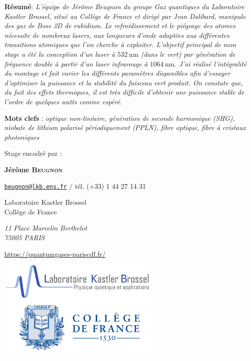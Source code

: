 \documentclass[11pt,a4paper]{article}
\newcommand{\lmbd}[1]{$\SI{#1}{\nano\metre}$}
\begin{document}
\begin{@empty}
\begin{center}
\parbox{15cm}{\small
	\textbf{R\'esum\'e}: \it L'équipe de Jérôme Beugnon du groupe Gaz quantiques du Laboratoire Kastler Brossel, situé au Collège de France et dirigé par Jean Dalibard, manipule des gaz de Bose 2D de rubidium. Le refroidissement et le piégeage des atomes nécessite de nombreux lasers, aux longueurs d'onde adaptées aux différentes transitions atomiques que l'on cherche à exploiter.
	L'objectif principal de mon stage a été la conception d'un laser à $\SI{532}{\nano\metre}$ (dans le vert) par génération de fréquence double à partir d'un laser infrarouge à \lmbd{1064}. J'ai réalisé l'intégralité du montage et fait varier les différents paramètres disponibles afin d'essayer d'optimiser la puissance et la stabilité du faisceau vert produit. On constate que, du fait des effets thermiques, il est très difficile d'obtenir une puissance stable de l'ordre de quelques watts comme espéré. 
\vspace{0.5cm}
} 


\vspace{0.25cm}

\parbox{15cm}{
\textbf{Mots clefs} : \it optique non-linéaire, génération de seconde harmonique (SHG), niobate de lithium polarisé périodiquement (PPLN), fibre optique, fibre à cristaux photoniques}%

\vspace{0.5cm}

\parbox{15cm}{
Stage encadr\'e par :

{\bf Jérôme \textsc{Beugnon}}

\href{mailto:beugnon@lkb.ens.fr}{\tt beugnon@lkb.ens.fr} / t\'el. (+33) 1 44 27 14 31


Laboratoire Kastler Brossel \\
Collège de France

{\it 11 Place Marcelin Berthelot \\
75005 PARIS}

\url{https://quantumgases-pariscdf.fr/}
} 

\vspace{0.5cm}

\includegraphics[height=5cm]{./img/logos_w_trans.png}


\end{center}
\end{@empty}
\end{document}
